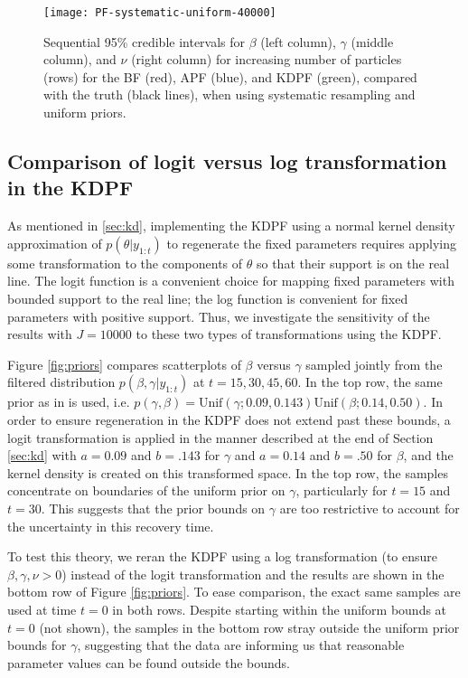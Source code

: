 \documentclass{elsarticle}
\begin{document}
\begin{figure}
\centering
\texttt{[image: PF-systematic-uniform-40000]}
\caption{Sequential 95\% credible intervals for $\beta$ (left column), $\gamma$ (middle column), and $\nu$ (right column) for increasing number of particles (rows) for the BF (red), APF (blue), and KDPF (green), compared with the truth (black lines), when using systematic resampling and uniform priors.} \label{fig:pfs}
\end{figure}

\subsection{Comparison of logit versus log transformation in the KDPF}

As mentioned in \ref{sec:kd}, implementing the KDPF using a normal kernel density approximation of $p(\theta|y_{1:t})$ to regenerate the fixed parameters requires applying some transformation to the components of $\theta$ so that their support is on the real line. The logit function is a convenient choice for mapping fixed parameters with bounded support to the real line; the log function is convenient for fixed parameters with positive support. Thus, we investigate the sensitivity of the results with $J = 10000$ to these two types of transformations using the KDPF.

Figure \ref{fig:priors} compares scatterplots of $\beta$ versus $\gamma$ sampled jointly from the filtered distribution $p(\beta,\gamma|y_{1:t})$ at $t = 15, 30, 45, 60$. In the top row, the same prior as in \citet{skvortsov2012monitoring} is used, i.e. \hbox{$p(\gamma,\beta) = \mbox{Unif}(\gamma;0.09, 0.143) \mbox{Unif}(\beta; 0.14, 0.50)$}. In order to ensure regeneration in the KDPF does not extend past these bounds, a logit transformation is applied in the manner described at the end of Section \ref{sec:kd} with $a = 0.09$ and $b = .143$ for $\gamma$ and $a = 0.14$ and $b = .50$ for $\beta$, and the kernel density is created on this transformed space. In the top row, the samples concentrate on boundaries of the uniform prior on $\gamma$, particularly for $t = 15$ and $t = 30$. This suggests that the prior bounds on $\gamma$ are too restrictive to account for the uncertainty in this recovery time.

To test this theory, we reran the KDPF using a log transformation (to ensure $\beta,\gamma,\nu>0$) instead of the logit transformation and the results are shown in the bottom row of Figure \ref{fig:priors}. To ease comparison, the exact same samples are used at time $t=0$ in both rows. Despite starting within the uniform bounds at $t=0$ (not shown), the samples in the bottom row stray outside the uniform prior bounds for $\gamma$, suggesting that the data are informing us that reasonable parameter values can be found outside the bounds.
\end{document}
